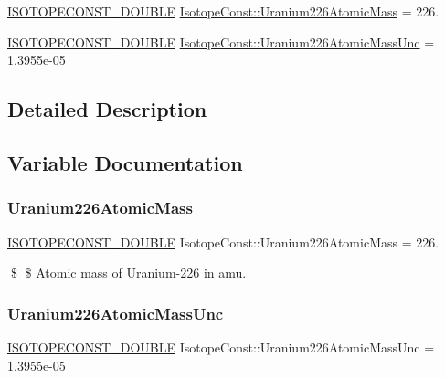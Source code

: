 \begin{DoxyCompactItemize}
\item 
\mbox{\hyperlink{group___isotope_const-_macros_ga8f45a7272ce02c0b4c65c44636ed719a}{I\+S\+O\+T\+O\+P\+E\+C\+O\+N\+S\+T\+\_\+\+D\+O\+U\+B\+LE}} \mbox{\hyperlink{group___isotope_const-_uranium-_u226_gad8abcef668e320d4ff9732bf179ae16f}{Isotope\+Const\+::\+Uranium226\+Atomic\+Mass}} = 226.
\item 
\mbox{\hyperlink{group___isotope_const-_macros_ga8f45a7272ce02c0b4c65c44636ed719a}{I\+S\+O\+T\+O\+P\+E\+C\+O\+N\+S\+T\+\_\+\+D\+O\+U\+B\+LE}} \mbox{\hyperlink{group___isotope_const-_uranium-_u226_ga3db23858dd18b2aaca866fb93111f62e}{Isotope\+Const\+::\+Uranium226\+Atomic\+Mass\+Unc}} = 1.\+3955e-\/05
\end{DoxyCompactItemize}


\subsection{Detailed Description}


\subsection{Variable Documentation}
\mbox{\label{group___isotope_const-_uranium-_u226_gad8abcef668e320d4ff9732bf179ae16f}} 
\subsubsection{\texorpdfstring{Uranium226\+Atomic\+Mass}{Uranium226AtomicMass}}
{\footnotesize\ttfamily \mbox{\hyperlink{group___isotope_const-_macros_ga8f45a7272ce02c0b4c65c44636ed719a}{I\+S\+O\+T\+O\+P\+E\+C\+O\+N\+S\+T\+\_\+\+D\+O\+U\+B\+LE}} Isotope\+Const\+::\+Uranium226\+Atomic\+Mass = 226.}

\$ \$ Atomic mass of Uranium-\/226 in amu. \mbox{\label{group___isotope_const-_uranium-_u226_ga3db23858dd18b2aaca866fb93111f62e}} 
\subsubsection{\texorpdfstring{Uranium226\+Atomic\+Mass\+Unc}{Uranium226AtomicMassUnc}}
{\footnotesize\ttfamily \mbox{\hyperlink{group___isotope_const-_macros_ga8f45a7272ce02c0b4c65c44636ed719a}{I\+S\+O\+T\+O\+P\+E\+C\+O\+N\+S\+T\+\_\+\+D\+O\+U\+B\+LE}} Isotope\+Const\+::\+Uranium226\+Atomic\+Mass\+Unc = 1.\+3955e-\/05}

